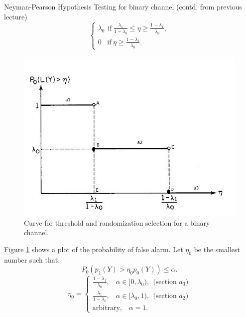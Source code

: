\documentclass[a4paper,english,12pt]{article}
\begin{document}
\begin{exmp}{Neyman-Pearson Hypothesis Testing for binary channel (contd. from previous lecture)}
\begin{equation}
\begin{cases}
\lambda_0\hspace{5pt}\mbox{if}\hspace{3pt}\frac{\lambda_1}{1-\lambda_0} \leq \eta \geq \frac{1-\lambda_1}{\lambda_0},\\
0\hspace{10pt}\mbox{if}\hspace{3pt}\eta \geq  \frac{1-\lambda_1}{\lambda_0}.
\end{cases}
\end{equation}
\begin{figure}[t]
\centering
\includegraphics[scale=0.8]{Figures/img.jpg} 
\caption{Curve for threshold and randomization selection for a binary channel.}
\label{fig:pfa}
\end{figure}
Figure \ref{fig:pfa} shows a plot of the probability of false alarm. Let $\eta_0$ be the smallest number such that,
\begin{equation}
{P}_0(p_1(Y) > \eta_0 p_0(Y)) \leq \alpha.
\end{equation}
\begin{equation}
\eta_0 =\begin{cases}
\frac{1-\lambda_1}{\lambda_0},\hspace{10pt}\alpha \in [0,\lambda_0),~~\mbox{(section $a_3$)}\\
\frac{\lambda_1}{1-\lambda_0},\hspace{10pt}\alpha \in [\lambda_0,1),~~\mbox{(section $a_2$)}\\
\mbox{arbitrary},\hspace{10pt}\alpha = 1.
\end{cases}
\end{equation}

\end{exmp}
\end{document}
